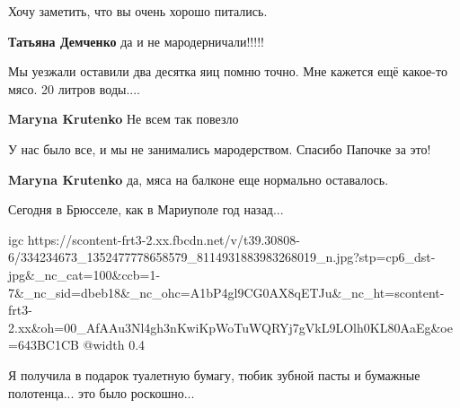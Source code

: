 
 
 
 
 

\qqSecCmt


Хочу заметить, что вы очень хорошо питались.

\begin{itemize} %
\textbf{Татьяна Демченко} да и не мародерничали!!!!!


Мы уезжали оставили два десятка яиц помню точно. Мне кажется ещё какое-то мясо. 20 литров воды....

\textbf{Maryna Krutenko} Не всем так повезло


У нас было все, и мы не занимались мародерством. Спасибо Папочке за это!

\textbf{Maryna Krutenko} да, мяса на балконе еще нормально оставалось.

\end{itemize} %


Сегодня в Брюсселе, как в Мариуполе год назад...

\ifcmt
  igc https://scontent-frt3-2.xx.fbcdn.net/v/t39.30808-6/334234673_1352477778658579_8114931883983268019_n.jpg?stp=cp6_dst-jpg&_nc_cat=100&ccb=1-7&_nc_sid=dbeb18&_nc_ohc=A1bP4gl9CG0AX8qETJu&_nc_ht=scontent-frt3-2.xx&oh=00_AfAAu3Nl4gh3nKwiKpWoTuWQRYj7gVkL9LOlh0KL80AaEg&oe=643BC1CB
	@width 0.4
\fi


Я получила в подарок туалетную бумагу, тюбик зубной пасты и бумажные
полотенца... это было роскошно...
